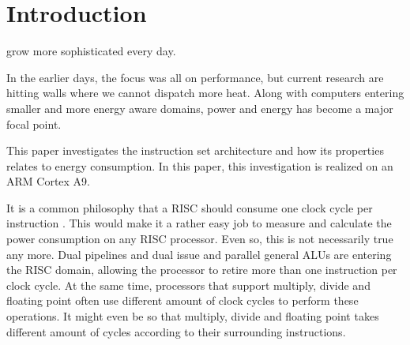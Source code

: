 \section{Introduction}

 grow more sophisticated every day.


In the earlier days, the focus was all on performance, but current research are
hitting walls where we cannot dispatch more heat.  Along with computers entering
smaller and more energy aware domains, power and energy has become a major focal
point\cite{patterson}\cite{hennessy}.

This paper investigates the instruction set architecture and how its properties
relates to energy consumption. In this paper, this investigation is realized on
an ARM Cortex A9.

It is a common philosophy that a RISC should consume one clock cycle per
instruction \cite{sivarama}. This would make it a rather easy job to measure
and calculate the power consumption on any RISC processor. Even so, this is not
necessarily true any more.  Dual pipelines and dual issue and parallel general
ALUs are entering the RISC domain, allowing the processor to retire more than
one instruction per clock cycle. At the same time, processors that support
multiply, divide and floating point often use different amount of clock cycles
to perform these operations. It might even be so that multiply, divide and
floating point takes different amount of cycles according to their surrounding
instructions.

